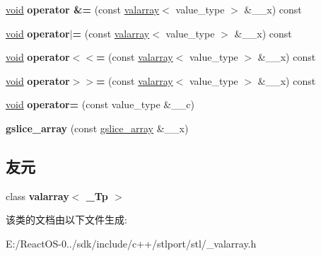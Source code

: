 \begin{DoxyCompactItemize}
\mbox{\label{classgslice__array_aefbe4848654d6d1b2fa8f092b35c8899}} 
\hyperlink{interfacevoid}{void} {\bfseries operator \&=} (const \hyperlink{classvalarray}{valarray}$<$ value\+\_\+type $>$ \&\+\_\+\+\_\+x) const
\item 
\mbox{\label{classgslice__array_a00267e3f56697b65e7b7fc59066f3cfb}} 
\hyperlink{interfacevoid}{void} {\bfseries operator$\vert$=} (const \hyperlink{classvalarray}{valarray}$<$ value\+\_\+type $>$ \&\+\_\+\+\_\+x) const
\item 
\mbox{\label{classgslice__array_ae5f10da4c1b9000b1994ce038b062e7d}} 
\hyperlink{interfacevoid}{void} {\bfseries operator$<$$<$=} (const \hyperlink{classvalarray}{valarray}$<$ value\+\_\+type $>$ \&\+\_\+\+\_\+x) const
\item 
\mbox{\label{classgslice__array_ab627013033539745f618a12d89f6e71c}} 
\hyperlink{interfacevoid}{void} {\bfseries operator$>$$>$=} (const \hyperlink{classvalarray}{valarray}$<$ value\+\_\+type $>$ \&\+\_\+\+\_\+x) const
\item 
\mbox{\label{classgslice__array_ad9f2ac78616bd7a7edea547576939d05}} 
\hyperlink{interfacevoid}{void} {\bfseries operator=} (const value\+\_\+type \&\+\_\+\+\_\+c)
\item 
\mbox{\label{classgslice__array_a277ea1e9a0ed1abad95319b091e9e3a0}} 
{\bfseries gslice\+\_\+array} (const \hyperlink{classgslice__array}{gslice\+\_\+array} \&\+\_\+\+\_\+x)
\end{DoxyCompactItemize}
\subsection*{友元}
\begin{DoxyCompactItemize}
\item 
\mbox{\label{classgslice__array_a0d82c6ffc3aec42e2ffa8d69cd3f0945}} 
class {\bfseries valarray$<$ \+\_\+\+Tp $>$}
\end{DoxyCompactItemize}


该类的文档由以下文件生成\+:\begin{DoxyCompactItemize}
\item 
E\+:/\+React\+O\+S-\/0../sdk/include/c++/stlport/stl/\+\_\+valarray.\+h\end{DoxyCompactItemize}
